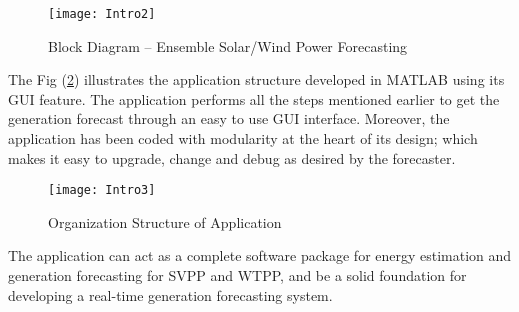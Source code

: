 \begin{figure}[H]
\centering
\texttt{[image: Intro2]}
\caption{Block Diagram – Ensemble Solar/Wind Power Forecasting}
\label{figc1h2} %
\end{figure}

The Fig (\ref{figc1h3}) illustrates the application structure developed in MATLAB using its GUI feature. The application performs all the steps mentioned earlier to get the generation forecast through an easy to use GUI interface. Moreover, the application has been coded with modularity at the heart of its design; which makes it easy to upgrade, change and debug as desired by the forecaster. 

\begin{figure}[H]
\centering
\texttt{[image: Intro3]}
\caption{Organization Structure of Application}
\label{figc1h3} %
\end{figure}

The application can act as a complete software package for energy estimation and generation forecasting for SVPP and WTPP, and be a solid foundation for developing a real-time generation forecasting system.\\